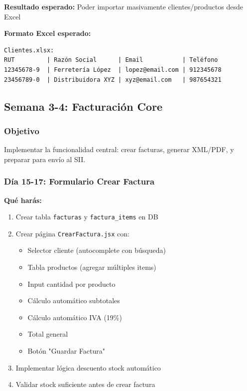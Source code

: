 \documentclass[11pt,a4paper]{article}
\begin{document}
\textbf{Resultado esperado:} Poder importar masivamente clientes/productos desde Excel

\textbf{Formato Excel esperado:}
\begin{verbatim}
Clientes.xlsx:
RUT         | Razón Social      | Email           | Teléfono
12345678-9  | Ferretería López  | lopez@email.com | 912345678
23456789-0  | Distribuidora XYZ | xyz@email.com   | 987654321
\end{verbatim}

\newpage

\subsection{Semana 3-4: Facturación Core}

\subsubsection{Objetivo}
Implementar la funcionalidad central: crear facturas, generar XML/PDF, y preparar para envío al SII.

\subsubsection{Día 15-17: Formulario Crear Factura}

\textbf{Qué harás:}
\begin{enumerate}
    \item Crear tabla \texttt{facturas} y \texttt{factura\_items} en DB
    \item Crear página \texttt{CrearFactura.jsx} con:
    \begin{itemize}
        \item Selector cliente (autocomplete con búsqueda)
        \item Tabla productos (agregar múltiples items)
        \item Input cantidad por producto
        \item Cálculo automático subtotales
        \item Cálculo automático IVA (19\%)
        \item Total general
        \item Botón "Guardar Factura"
    \end{itemize}
    \item Implementar lógica descuento stock automático
    \item Validar stock suficiente antes de crear factura
\end{enumerate}
\end{document}
